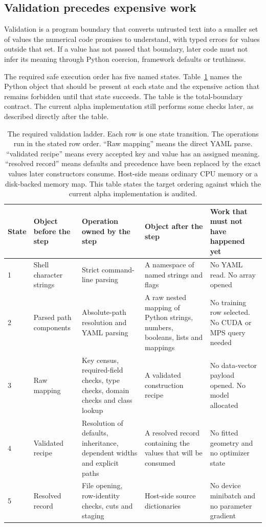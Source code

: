 \documentclass[10pt,aps,prd,twocolumn,nofootinbib]{revtex4-2}
\begin{document}
\subsection{Validation precedes expensive work}

Validation is a program boundary that converts untrusted text into a smaller
set of values the numerical code promises to understand, with typed errors for
values outside that set.  If a value has not passed that
boundary, later code must not infer its meaning through Python coercion,
framework defaults or truthiness.

The required safe execution order has five named states.
Table~\ref{tab:validation-ladder} names the Python object that should be
present at each state and the expensive action that remains forbidden until
that state succeeds.  The table is the total-boundary contract.  The current
alpha implementation still performs some checks later, as described directly
after the table.

\begin{table}[t]
\centering
\begin{tabular}{p{}p{}p{}p{}p{}}
\toprule
State & Object before the step & Operation owned by the step & Object after
the step & Work that must not have happened yet \\
\midrule
1 & Shell character strings & Strict command-line parsing & A namespace of
named strings and flags & No YAML read.  No array opened \\
2 & Parsed path components & Absolute-path resolution and YAML parsing & A raw
nested mapping of Python strings, numbers, booleans, lists and mappings & No
training row selected.  No CUDA or MPS query needed \\
3 & Raw mapping & Key census, required-field checks, type checks, domain
checks and class lookup & A validated construction recipe & No data-vector
payload opened.  No model allocated \\
4 & Validated recipe & Resolution of defaults, inheritance, dependent widths
and explicit paths & A resolved record containing the values that will be
consumed & No fitted geometry and no optimizer state \\
5 & Resolved record & File opening, row-identity checks, cuts and staging &
Host-side source dictionaries & No device minibatch and no parameter gradient
\\
\bottomrule
\end{tabular}
\caption{The required validation ladder.  Each row is one state transition.
The operations run in the stated row order.  ``Raw mapping'' means the
direct YAML parse. ``validated recipe'' means every accepted key and value has
an assigned meaning. ``resolved record'' means defaults and precedence have
been replaced by the exact values later constructors consume.  Host-side
means ordinary CPU memory or a disk-backed memory map.  This table states the
target ordering against which the current alpha implementation is audited.}
\label{tab:validation-ladder}
\end{table}
\end{document}

